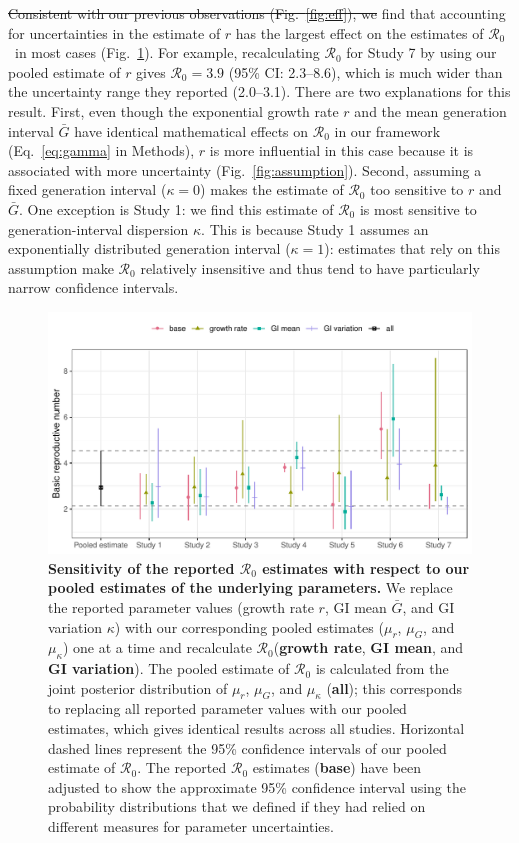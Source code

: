 \documentclass[12pt]{article}
\newcommand{\eref}[1]{Eq.~\ref{eq:#1}}
\newcommand{\fref}[1]{Fig.~\ref{fig:#1}}
\newcommand{\Ro}{\ensuremath{{\mathcal R}_{0}}\xspace}
\providecommand{\DIFaddtex}[1]{{\protect\color{blue}\uwave{#1}}} %
\providecommand{\DIFdeltex}[1]{{\protect\color{red}\sout{#1}}}                      %
\providecommand{\DIFaddbegin}{} %
\providecommand{\DIFaddend}{} %
\providecommand{\DIFdelbegin}{} %
\providecommand{\DIFdelend}{} %
\providecommand{\DIFadd}[1]{\texorpdfstring{\DIFaddtex{#1}}{#1}} %
\providecommand{\DIFdel}[1]{\texorpdfstring{\DIFdeltex{#1}}{}} %
\newcommand{\DIFscaledelfig}{0.5}
\newlength{\DIFdelgraphicswidth} %
\newlength{\DIFdelgraphicsheight} %
\newcommand{\DIFaddincludegraphics}[2][]{{\color{blue}\fbox{\DIFOincludegraphics[#1]{#2}}}} %
\newcommand{\DIFdelincludegraphics}[2][]{%
\sbox{\DIFdelgraphicsbox}{\DIFOincludegraphics[#1]{#2}}%
\settoboxwidth{\DIFdelgraphicswidth}{\DIFdelgraphicsbox} %
\settoboxtotalheight{\DIFdelgraphicsheight}{\DIFdelgraphicsbox} %
\scalebox{\DIFscaledelfig}{%
\parbox[b]{\DIFdelgraphicswidth}{\usebox{\DIFdelgraphicsbox}\\[-\baselineskip] \rule{\DIFdelgraphicswidth}{0em}}\llap{\resizebox{\DIFdelgraphicswidth}{\DIFdelgraphicsheight}{%
\setlength{\unitlength}{\DIFdelgraphicswidth}%
\begin{picture}(1,1)%
\thicklines\linethickness{2pt} %
{\color[rgb]{1,0,0}\put(0,0){\framebox(1,1){}}}%
{\color[rgb]{1,0,0}\put(0,0){\line( 1,1){1}}}%
{\color[rgb]{1,0,0}\put(0,1){\line(1,-1){1}}}%
\end{picture}%
}\hspace*{3pt}}} %
} %
\DeclareRobustCommand{\DIFaddbegin}{\DIFOaddbegin \let\includegraphics\DIFaddincludegraphics} %
\DeclareRobustCommand{\DIFaddend}{\DIFOaddend \let\includegraphics\DIFOincludegraphics} %
\DeclareRobustCommand{\DIFdelbegin}{\DIFOdelbegin \let\includegraphics\DIFdelincludegraphics} %
\DeclareRobustCommand{\DIFdelend}{\DIFOaddend \let\includegraphics\DIFOincludegraphics} %
\begin{document}
\DIFdelbegin \DIFdel{Consistent with our previous observations (\fref{eff}),
we }\DIFdelend \DIFaddbegin \DIFadd{We }\DIFaddend find that accounting for uncertainties in the estimate of $r$ has the largest effect on the estimates of \Ro\ in most cases (\fref{R0}).
For example, recalculating \Ro for Study 7 by using our pooled estimate of $r$ gives $\Ro = 3.9$ (95\% CI: 2.3--8.6), which is much wider than the uncertainty range they reported (2.0--3.1).
There are two explanations for this result.
First, even though the exponential growth rate $r$ and the mean generation interval $\bar G$ have identical mathematical effects on \Ro in our framework (\eref{gamma} in Methods),
$r$ is more influential in this case because it is associated with more uncertainty (\fref{assumption}).
Second, assuming a fixed generation interval ($\kappa=0$) makes the estimate of \Ro too sensitive to $r$ and $\bar G$.
One exception is Study 1: we find this estimate of \Ro is most sensitive to generation-interval dispersion $\kappa$.
This is because Study 1 assumes an exponentially distributed generation interval ($\kappa=1$): estimates that rely on this assumption make \Ro relatively insensitive and thus tend to have particularly narrow confidence intervals.

\begin{figure}[!th]
\includegraphics[width=\textwidth]{compare_R0.pdf}
\caption{
\textbf{Sensitivity of the reported \Ro estimates with respect to our pooled estimates of the underlying parameters.}
We replace the reported parameter values (growth rate $r$, GI mean $\bar G$, and GI variation $\kappa$) with our corresponding pooled estimates ($\mu_r$, $\mu_G$, and $\mu_\kappa$) one at a time and recalculate \Ro (\textbf{growth rate}, \textbf{GI mean}, and \textbf{GI variation}).
The pooled estimate of \Ro is calculated from the joint posterior distribution of $\mu_r$, $\mu_G$, and $\mu_\kappa$ (\textbf{all});
this corresponds to replacing all reported parameter values with our pooled estimates, which gives identical results across all studies.
Horizontal dashed lines represent the 95\% confidence intervals of our pooled estimate of \Ro.
The reported \Ro estimates (\textbf{base}) have been adjusted to show the approximate 95\% confidence interval using the probability distributions that we defined if they had relied on different measures for parameter uncertainties.
}
\label{fig:R0}
\end{figure}
\end{document}

